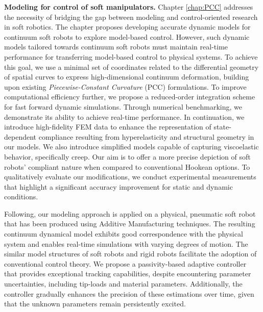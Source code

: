 \textbf{Modeling for control of soft manipulators.} Chapter \ref{chap:PCC} addresses the necessity of bridging the gap between modeling and control-oriented research in soft robotics. The chapter proposes developing accurate dynamic models for continuum soft robots to explore model-based control. However, such dynamic models tailored towards continuum soft robots must maintain real-time performance for transferring model-based control to physical systems. To achieve this goal, we use a minimal set of coordinates related to the differential geometry of spatial curves to express high-dimensional continuum deformation, building upon existing \textit{Piecewise-Constant Curvature} (PCC) formulations. To improve computational efficiency further, we propose a reduced-order integration scheme for fast forward dynamic simulations. Through numerical benchmarking, we demonstrate its ability to achieve real-time performance. In continuation, we introduce high-fidelity FEM data to enhance the representation of state-dependent compliance resulting from hyperelasticity and structural geometry in our models. We also introduce simplified models capable of capturing viscoelastic behavior, specifically creep. Our aim is to offer a more precise depiction of soft robots' compliant nature when compared to conventional Hookean options. To qualitatively evaluate our modifications, we conduct experimental measurements that highlight a significant accuracy improvement for static and dynamic conditions.

Following, our modeling approach is applied on a physical, pneumatic soft robot that has been produced using Additive Manufacturing techniques. The resulting continuum dynamical model exhibits good correspondence with the physical system and enables real-time simulations with varying degrees of motion. The similar model structures of soft robots and rigid robots facilitate the adoption of conventional control theory. We propose a passivity-based adaptive controller that provides exceptional tracking capabilities, despite encountering parameter uncertainties, including tip-loads and material parameters. Additionally, the controller gradually enhances the precision of these estimations over time, given that the unknown parameters remain persistently excited.

